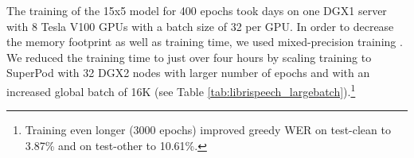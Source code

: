 \documentclass{article}
\begin{document}
\begin{table}[thb]
\centering
\caption{LibriSpeech results, WER ()}
\vspace{4pt}
\label{tab:LibriSpeech}
\end{table}
The training of the 15x5 model for 400 epochs
took  days on one DGX1 server with 8 Tesla V100 GPUs with a batch size of 32 per GPU.  In order to  decrease the memory footprint as well as training time, we used mixed-precision training  \cite{micikevicius2017mixed}. We reduced the training time to just over four hours  by scaling training to SuperPod with 32 DGX2 nodes with larger number of epochs and with an increased global batch of 16K (see Table \ref{tab:librispeech_largebatch}).\footnote{Training even longer (3000 epochs) improved greedy WER on test-clean to 3.87\% and on test-other to  10.61\%.}
\end{document}

